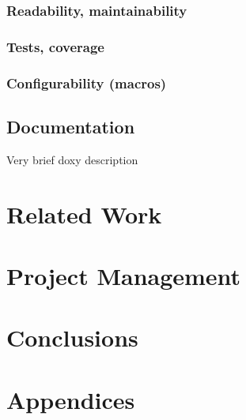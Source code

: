 \documentclass[11pt]{article}
\begin{document}
\subsubsection{Readability, maintainability}
\subsubsection{Tests, coverage}
\subsubsection{Configurability (macros)}

\subsection{Documentation}

Very brief doxy description





\clearpage
\section{Related Work}
\label{sec:related}


\clearpage
\section{Project Management}
\label{sec:project-mgmt}


\clearpage
\section{Conclusions}
\label{sec:conclusions}


\newpage
\printbibliography[heading=bibintoc]

\newpage
\section{Appendices}
\label{sec:appendices}

\end{document}

